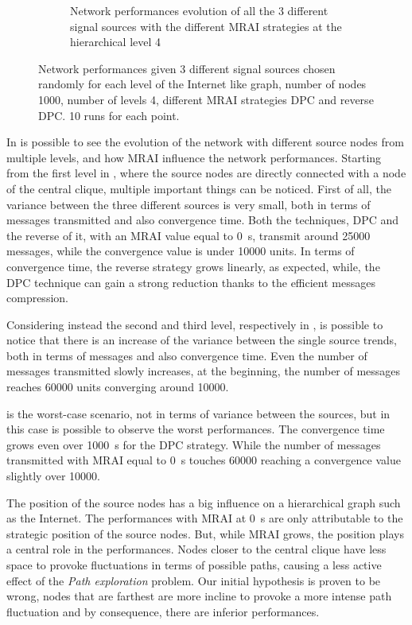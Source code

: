 \begin{figure}[h]
\begin{subfigure}[b]{0.49\textwidth}
		 \caption{Network performances evolution of all the \num{3} different signal sources
			with the different \ac{MRAI} strategies at the hierarchical level \num{4}}
         \label{fig:different_levels_4}
     \end{subfigure}
     \hfill
	 \caption{Network performances given \num{3} different signal sources chosen
		randomly for each level of the Internet like graph, number of nodes
		\num{1000}, number of levels \num{4}, different \ac{MRAI} strategies
		\ac{DPC} and reverse \ac{DPC}. \num{10} runs for each point.}
	 \label{fig:different_levels}
\end{figure}

In  is possible to see the evolution of the network
with different source nodes from multiple levels, and how \ac{MRAI} influence
the network performances.
Starting from the first level in , where the source
nodes are directly connected with a node of the central clique, multiple
important things can be noticed.
First of all, the variance between the three different sources is very small,
both in terms of messages transmitted and also convergence time.
Both the techniques, \ac{DPC} and the reverse of it, with an \ac{MRAI} value
equal to \SI{0}{\second}, transmit around \num{25000} messages, while the
convergence value is under \num{10000} units.
In terms of convergence time, the reverse strategy grows linearly, as expected,
while, the \ac{DPC} technique can gain a strong reduction thanks to
the efficient messages compression.

Considering instead the second and third level, respectively in
, is possible to notice that there
is an increase of the variance between the single source trends, both in terms
of messages and also convergence time.
Even the number of messages transmitted slowly increases, at the beginning, the
number of messages reaches \num{60000} units converging around \num{10000}.

 is the worst-case scenario, not in
terms of variance between the sources, but in this case is possible to observe
the worst performances.
The convergence time grows even over \SI{1000}{\second} for the \ac{DPC} strategy.
While the number of messages transmitted with \ac{MRAI} equal to \SI{0}{\second}
touches \num{60000} reaching a convergence value slightly over \num{10000}.

The position of the source nodes has a big influence on a hierarchical graph
such as the Internet.
The performances with \ac{MRAI} at \SI{0}{\second} are only attributable to the
strategic position of the source nodes.
But, while \ac{MRAI} grows, the position plays a central role in the performances.
Nodes closer to the central clique have less space to provoke fluctuations
in terms of possible paths, causing a less active effect of the \textit{Path exploration}
problem.
Our initial hypothesis is proven to be wrong, nodes that are farthest are more incline
to provoke a more intense path fluctuation and by consequence, there are inferior
performances.

